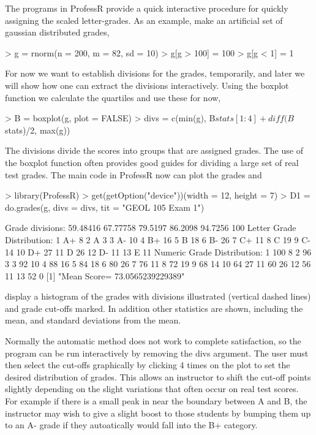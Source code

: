 \documentclass{article}
\begin{document}
The programs in ProfessR provide a quick interactive 
procedure for quickly assigning the scaled letter-grades.
As an example,  make an artificial set of gaussian distributed grades,
\begin{Schunk}
\begin{Sinput}
> g = rnorm(n = 200, m = 82, sd = 10)
> g[g > 100] = 100
> g[g < 1] = 1
\end{Sinput}
\end{Schunk}

For now we want to establish divisions for
the grades, temporarily, and later we will show how
one can extract the divisions interactively.
Using the boxplot function we calculate the quartiles
and use these for now,
\begin{Schunk}
\begin{Sinput}
> B = boxplot(g, plot = FALSE)
> divs = c(min(g), B$stats[1:4] + diff(B$stats)/2, max(g))
\end{Sinput}
\end{Schunk}
The divisions divide the scores
into groups that are assigned grades.
The use of the boxplot function often provides good 
guides for dividing a large set of 
real test grades.
The main code in ProfessR now can plot the grades and
\begin{Schunk}
\begin{Sinput}
> library(ProfessR)
> get(getOption("device"))(width = 12, height = 7)
> D1 = do.grades(g, divs = divs, tit = "GEOL 105 Exam 1")
\end{Sinput}
\begin{Soutput}
Grade divisions:
59.48416
67.77758
79.5197
86.2098
94.7256
100
Letter Grade Distribution:
1 A+ 8
2 A 3
3 A- 10
4 B+ 16
5 B 18
6 B- 26
7 C+ 11
8 C 19
9 C- 14
10 D+ 27
11 D 26
12 D- 11
13 E 11
Numeric Grade Distribution:
1 100 8
2 96 3
3 92 10
4 88 16
5 84 18
6 80 26
7 76 11
8 72 19
9 68 14
10 64 27
11 60 26
12 56 11
13 52 0
[1] "Mean Score= 73.0565239229389"
\end{Soutput}
\end{Schunk}
display a histogram of the grades with divisions
illustrated (vertical dashed lines)  and grade  cut-offs marked.
In addition other statistics are shown, including the mean,
and standard deviations from the mean.

Normally the automatic method does not work to complete satisfaction,
so the program can be run interactively by 
removing the  divs argument.
The user must then
select the cut-offs graphically by clicking 4 times on the
plot to set  the desired distribution of grades.
This allows an instructor to shift the
cut-off points slightly depending on
the slight variations that often occur on real test scores.
For example if there is 
a small peak in near the boundary between A and B,
the instructor may wish to give a slight boost
to those students by bumping them up to an A- grade
if they autoatically would fall into the B+ category.
\end{document}
